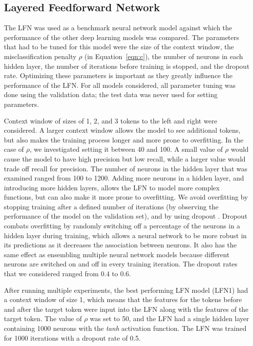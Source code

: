 \documentclass[11pt,a4paper]{article}
\newcommand{\eqnref}[1]{Equation~\ref{#1}}
\begin{document}
\subsection{Layered Feedforward Network}

The LFN was used as a benchmark neural network model against which
the performance of the other deep learning models was compared. The
parameters that had to be tuned for this model were the size of the
context window, the misclassification penalty $\rho$ (in
\eqnref{eqn:c}), the number of neurons in each hidden layer, the
number of iterations before training is stopped, and the dropout
rate. Optimizing these parameters is important as they greatly
influence the performance of the LFN. For all models considered, all
parameter tuning was done using the validation data; the test data was
never used for setting parameters.

Context window of sizes of 1, 2, and 3 tokens to the left and right
were considered. A larger context window allows the model to see
additional tokens, but also makes the training process longer and more
prone to overfitting.  In the case of $\rho$, we investigated setting
it between 40 and 100. A small value of $\rho$ would cause the model
to have high precision but low recall, while a larger value would
trade off recall for precision. The number of neurons in the hidden
layer that was examined ranged from 100 to 1200. Adding more neurons
in a hidden layer, and introducing more hidden layers, allows the LFN
to model more complex functions, but can also make it more prone to
overfitting. We avoid overfitting by stopping training after a defined
number of iterations (by observing the performance of the model on the
validation set), and by using dropout
\cite{DBLP:journals/jmlr/SrivastavaHKSS14}. Dropout combats
overfitting by randomly switching off a percentage of the neurons in a
hidden layer during training, which allows a neural network to be more
robust in its predictions as it decreases the association between
neurons. It also has the same effect as ensembling multiple neural
network models because different neurons are switched on and off in
every training iteration. The dropout rates that we considered ranged
from 0.4 to 0.6.

After running multiple experiments, the best performing LFN model
(LFN1) had a context window of size 1, which means that the features
for the tokens before and after the target token were input into the
LFN along with the features of the target token. The value of $\rho$
was set to 50, and the LFN had a single hidden layer containing 1000
neurons with the \textit{tanh} activation function. The LFN was trained for
1000 iterations with a dropout rate of 0.5.
\end{document}
